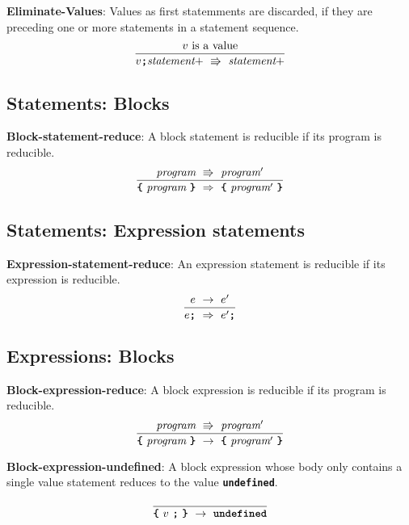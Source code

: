 \vspace{10mm}
\textbf{Eliminate-Values}: Values as first statemments are discarded, if
they are preceding one or more statements in a statement sequence.
\[
\frac{
v \ \mbox{is a value}  
}{
v \textbf{\texttt{;}} \textit{statement}+\ 
   \Rrightarrow  \ 
  \textit{statement}+
}
\]

\subsection*{Statements: Blocks}

\textbf{Block-statement-reduce}: A block statement is
reducible if its program is reducible.
\[
\frac{
  \textit{program} 
\ \Rrightarrow \ 
  \textit{program}'
}{  
  \textbf{\texttt{\{}} \
  \textit{program} \ 
  \textbf{\texttt{\}}}
\  \Rightarrow \ 
  \textbf{\texttt{\{}} \
  \textit{program}' \ 
  \textbf{\texttt{\}}}
}
\]

\subsection*{Statements: Expression statements}

\textbf{Expression-statement-reduce}: An expression statement
is reducible if its expression is reducible.
\[
\frac{
  e\ \rightarrow\ e'
}{  
  e \textbf{\texttt{;}}
  \ \Rightarrow \ 
  e' \textbf{\texttt{;}}
}
\]


\subsection*{Expressions: Blocks}

\textbf{Block-expression-reduce}: A block expression is
reducible if its program is reducible.
\[
\frac{
  \textit{program} 
\ \Rrightarrow \ 
  \textit{program}'
}{  
  \textbf{\texttt{\{}} \
  \textit{program} \ 
  \textbf{\texttt{\}}}
\  \rightarrow \ 
  \textbf{\texttt{\{}} \
  \textit{program}' \ 
  \textbf{\texttt{\}}}
}
\]

\vspace{10mm}

\textbf{Block-expression-undefined}: A block expression
whose body only contains a single value statement reduces to
the value 
\textbf{\texttt{undefined}}.

\[
\frac{
}{  
  \textbf{\texttt{\{}} \
  v \ 
  \textbf{\texttt{;}} \ 
  \textbf{\texttt{\}}}
\  \rightarrow \ 
  \textbf{\texttt{undefined}}
}
\]

\vspace{10mm}

